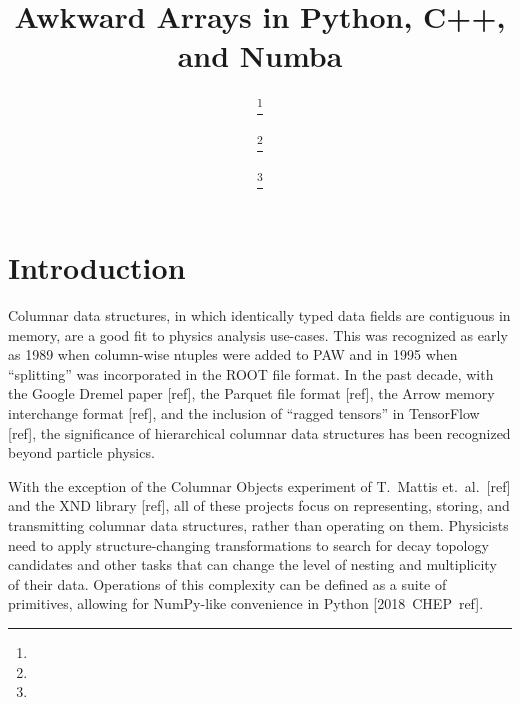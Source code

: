 \documentclass{webofc}
\begin{document}
\title{Awkward Arrays in Python, C++, and Numba}

\author{%
 \fnsep\thanks{} \and
{} \fnsep\thanks{} \and
{} \fnsep\thanks{}}



\maketitle

\section{Introduction}

Columnar data structures, in which identically typed data fields are contiguous in memory, are a good fit to physics analysis use-cases. This was recognized as early as 1989 when column-wise ntuples were added to PAW and in 1995 when ``splitting'' was incorporated in the ROOT file format. In the past decade, with the Google Dremel paper [ref], the Parquet file format [ref], the Arrow memory interchange format [ref], and the inclusion of ``ragged tensors'' in TensorFlow [ref], the significance of hierarchical columnar data structures has been recognized beyond particle physics.

With the exception of the Columnar Objects experiment of T.\ Mattis et.\ al.\ [ref] and the XND library [ref], all of these projects focus on representing, storing, and transmitting columnar data structures, rather than operating on them. Physicists need to apply structure-changing transformations to search for decay topology candidates and other tasks that can change the level of nesting and multiplicity of their data. Operations of this complexity can be defined as a suite of primitives, allowing for NumPy-like convenience in Python \mbox{[2018 CHEP ref].\hspace{-1 cm}}
\end{document}
